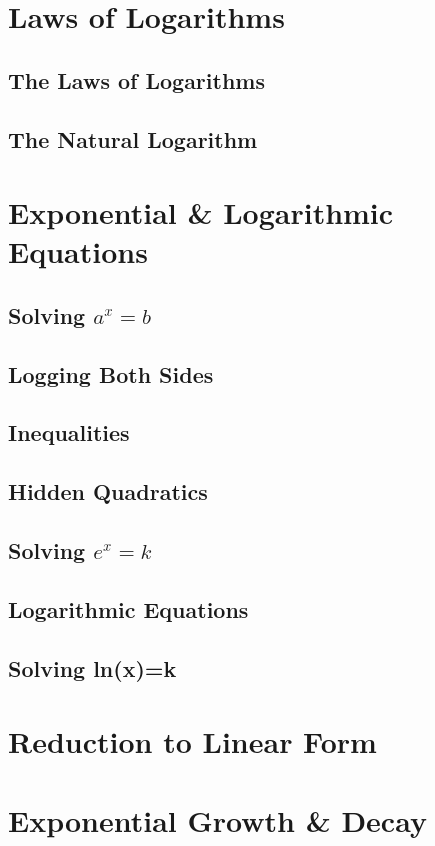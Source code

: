 \documentclass[../alevelmaths.tex]{subfiles}
\begin{document}
\section{Laws of Logarithms}
\subsection*{The Laws of Logarithms}
\subsection*{The Natural Logarithm}
\section{Exponential \& Logarithmic Equations}
\subsection*{Solving \texorpdfstring{$a^x=b$}{a to the x = b}}
\subsection*{Logging Both Sides}
\subsection*{Inequalities}
\subsection*{Hidden Quadratics}
\subsection*{Solving \texorpdfstring{$e^x=k$}{e to the x = k}}
\subsection*{Logarithmic Equations}
\subsection*{Solving ln(x)=k}
\section{Reduction to Linear Form}
\section{Exponential Growth \& Decay}
\end{document}
